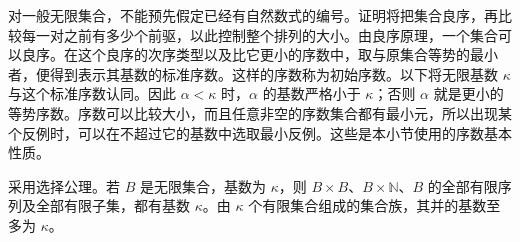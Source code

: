 \ProseParagraphBreak
对一般无限集合，不能预先假定已经有自然数式的编号。证明将把集合良序，再比较每一对之前有多少个前驱，以此控制整个排列的大小。由良序原理，一个集合可以良序。在这个良序的次序类型以及比它更小的序数中，取与原集合等势的最小者，便得到表示其基数的标准序数。这样的序数称为初始序数。以下将无限基数 \(\kappa\) 与这个标准序数认同。因此 \(\alpha<\kappa\) 时，\(\alpha\) 的基数严格小于 \(\kappa\)；否则 \(\alpha\) 就是更小的等势序数。序数可以比较大小，而且任意非空的序数集合都有最小元，所以出现某个反例时，可以在不超过它的基数中选取最小反例。这些是本小节使用的序数基本性质。

\begin{proposition}\label{b1:prop:finite-support-cardinality}
	采用选择公理。若 \(B\) 是无限集合，基数为 \(\kappa\)，则 \(B\times B\)、\(B\times\mathbb N\)、\(B\) 的全部有限序列及全部有限子集，都有基数 \(\kappa\)。由 \(\kappa\) 个有限集合组成的集合族，其并的基数至多为 \(\kappa\)。
\end{proposition}

